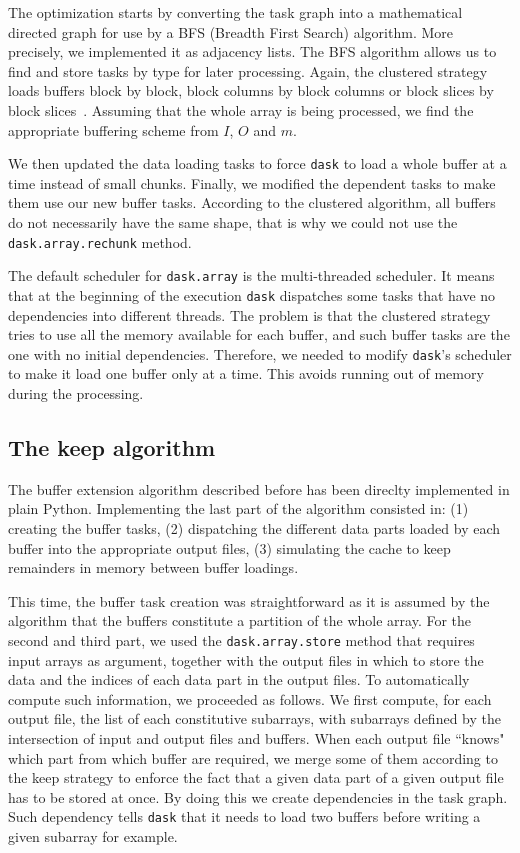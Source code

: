 \documentclass[conference]{IEEEtran}
\begin{document}
The optimization starts by converting the task graph into a mathematical
directed graph for use by a BFS (Breadth First Search) algorithm. More
precisely, we implemented it as adjacency lists. The BFS algorithm allows us to
find and store tasks by type for later processing.  Again, the clustered
strategy loads buffers block by block, block columns by block columns or block
slices by block slices~\cite{seqalgorithms}. Assuming that the whole array is
being processed, we find the appropriate buffering scheme from $I$, $O$ and $m$.

We then updated the data loading tasks to force \texttt{dask} to load a whole buffer at
a time instead of small chunks. Finally, we modified the dependent tasks to make
them use our new buffer tasks. According to the clustered algorithm, all buffers
do not necessarily have the same shape, that is why we could not use the
\texttt{dask.array.rechunk} method.

The default scheduler for \texttt{dask.array} is the multi-threaded scheduler. It means
that at the beginning of the execution \texttt{dask} dispatches some tasks that have
no dependencies into different threads. The problem is that the clustered
strategy tries to use all the memory available for each buffer, and such buffer
tasks are the one with no initial dependencies. Therefore, we needed to
modify \texttt{dask}'s scheduler to make it load one buffer only at a time.
This avoids running out of memory during the processing.

\subsection{The keep algorithm}

The buffer extension algorithm described before has been direclty
implemented in plain Python. Implementing the last part of the algorithm
consisted in: (1) creating the buffer tasks, (2) dispatching the different data
parts loaded by each buffer into the appropriate output files, (3) simulating
the cache to keep remainders in memory between buffer loadings.

This time, the buffer task creation was straightforward as it is assumed by the
algorithm that the buffers constitute a partition of the whole array. For the
second and third part, we used the \texttt{dask.array.store} method that
requires input arrays as argument, together with the output files in which to
store the data and the indices of each data part in the output files. To
automatically compute such information, we proceeded as follows. We first
compute, for each output file, the list of each constitutive subarrays, with
subarrays defined by the intersection of input and output files and buffers.
When each output file ``knows" which part from which buffer are required, we
merge some of them according to the keep strategy to enforce the fact that
a given data part of a given output file has to be stored at once. By doing this
we create dependencies in the task graph. Such dependency tells \texttt{dask} that it
needs to load two buffers before writing a given subarray for example.
\end{document}
